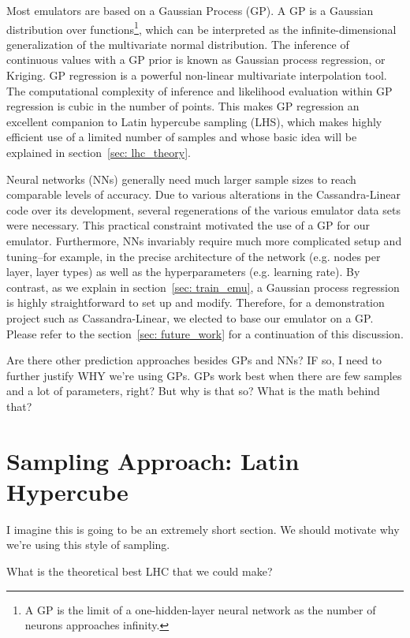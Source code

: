 
Most emulators are based on a Gaussian Process (GP). A GP is a Gaussian
distribution over functions\footnote
{A GP is the limit of a one-hidden-layer neural network as the number of
neurons approaches infinity.}, which can be interpreted
as the infinite-dimensional generalization of the multivariate normal
distribution. The inference of continuous values with a GP prior
is known as Gaussian process regression, or Kriging. GP regression is a
powerful non-linear multivariate interpolation tool. The computational
complexity of inference and likelihood evaluation within GP regression is cubic
in the number of points. This makes GP regression an excellent companion to
Latin hypercube sampling (LHS), which makes highly efficient use of a limited 
number of samples and whose basic idea will be explained in section~\ref{sec:
lhc_theory}.

Neural networks (NNs) generally need much larger sample sizes to reach
comparable levels of
accuracy. Due to various alterations in the Cassandra-Linear code over its
development, several regenerations of the various emulator data sets were
necessary. This practical constraint motivated the use of a GP for our
emulator. Furthermore, NNs invariably require much more complicated setup and
tuning--for example, in the precise architecture of the network (e.g. nodes
per layer, layer types) as well as the hyperparameters (e.g. learning rate).
By contrast, as we explain in section~\ref{sec: train_emu}, a Gaussian
process regression is highly straightforward to set up and modify. Therefore,
for a demonstration project such as Cassandra-Linear, we elected to base our
emulator on a GP. Please refer to the section~\ref{sec: future_work} for a
continuation of this discussion.

Are there other prediction approaches besides GPs and NNs? IF so, I need to
further justify WHY we’re using GPs.
GPs work best when there are few samples and a lot of parameters, right?
But why is that so? What is the math behind that?


\section{Sampling Approach: Latin Hypercube}
\label{sec: lhc_theory}

I imagine this is going to be an extremely short section. We should motivate why we're using this style of sampling.

What is the theoretical best LHC that we could make?

